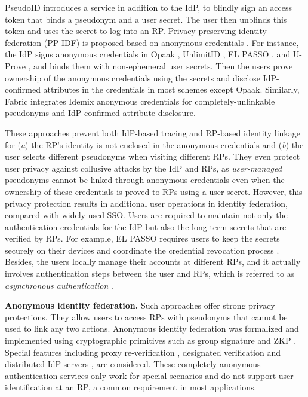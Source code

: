 PseudoID \cite{PseudoID} introduces a service in addition to the IdP,
 to blindly sign \cite{blind-sign}
an access token that binds a pseudonym and a user secret.
The user then unblinds this token and uses the secret to log into an RP.
Privacy-preserving identity federation (PP-IDF) \cite{hyperledge-idemix, Opaak, uprov, UnlimitID, ELPASSO} is proposed based on anonymous credentials \cite{anon-credential-2001, idemix, anon-credential}. For instance, the IdP signs anonymous credentials in Opaak \cite{Opaak}, UnlimitID \cite{UnlimitID}, EL PASSO \cite{ELPASSO}, and U-Prove \cite{uprov}, and binds them with non-ephemeral user secrets. %
Then the users prove ownership of the anonymous credentials using the secrets and disclose IdP-confirmed attributes in the credentials in most schemes except Opaak.
Similarly, Fabric \cite{hyperledge-idemix} integrates Idemix anonymous credentials \cite{idemix} for completely-unlinkable pseudonyms and IdP-confirmed attribute disclosure.


These approaches \cite{PseudoID,Opaak,ELPASSO,uprov,UnlimitID,hyperledge-idemix} prevent both IdP-based tracing and RP-based identity linkage for (\emph{a}) the RP's identity is not enclosed in the anonymous credentials and (\emph{b}) the user selects different pseudonyms when visiting different RPs.
They even protect user privacy against collusive attacks by the IdP and RPs, as \emph{user-managed} pseudonyms cannot be linked through anonymous credentials \cite{anon-credential-2001, idemix, anon-credential} even when the ownership of these credentials is proved to RPs using a user secret.
However, this privacy protection results in additional user operations in identity federation, compared with widely-used SSO.
Users are required to maintain not only the authentication credentials for the IdP but also the long-term secrets that are verified by RPs.
For example, EL PASSO \cite{ELPASSO} requires users to keep the secrets securely on their devices and coordinate the credential revocation process \cite{ELPASSO, UnlimitID}.
Besides, the users locally manage their accounts at different RPs, and it actually involves authentication steps between the user and RPs, which is referred to as \emph{asynchronous authentication} \cite{ELPASSO}.


\noindent\textbf{Anonymous identity federation.}
Such approaches offer strong privacy protections. They allow users to access RPs with pseudonyms that cannot be used to link any two actions.
Anonymous identity federation was formalized \cite{WangWS13} and implemented using cryptographic primitives such as group signature and ZKP \cite{WangWS13, HanCSTWW20, HanCSTW18}. Special features including proxy re-verification \cite{HanCSTWW20}, designated verification \cite{HanCSTW18} and distributed IdP servers \cite{TSAPP}, are considered. 
These completely-anonymous authentication services only work for special scenarios and do not support user identification at an RP, a common requirement in most applications.
